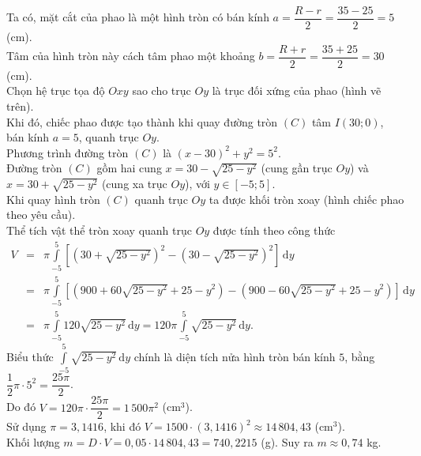 \begin{ex}
{\begin{center}
\end{center}
Ta có, mặt cắt của phao là một hình tròn có bán kính $a = \dfrac{R-r}{2} = \dfrac{35-25}{2} = 5$ (cm).\\
Tâm của hình tròn này cách tâm phao một khoảng $b = \dfrac{R+r}{2} = \dfrac{35+25}{2} = 30$ (cm).\\
Chọn hệ trục tọa độ $Oxy$ sao cho trục $Oy$ là trục đối xứng của phao (hình vẽ trên). \\
Khi đó, chiếc phao được tạo thành khi quay đường tròn $(C)$ tâm $I (30; 0)$, bán kính $a=5$, quanh trục $Oy$.\\
Phương trình đường tròn $(C)$ là $(x-30)^2 + y^2 = 5^2$.\\
Đường tròn $(C)$ gồm hai cung $x = 30 - \sqrt{25-y^2}$ (cung gần trục $Oy$) và $x = 30 + \sqrt{25-y^2}$ (cung xa trục $Oy$), với $y \in [-5; 5]$.\\
Khi quay hình tròn $(C)$ quanh trục $Oy$ ta được khối tròn xoay (hình chiếc phao theo yêu cầu).\\ 
Thể tích vật thể tròn xoay quanh trục $Oy$ được tính theo công thức
\begin{eqnarray*}
V & = & \pi \displaystyle \int \limits_{-5}^{5} \left[ \left( 30 + \sqrt{25-y^2} \right)^2 - \left( 30 - \sqrt{25-y^2} \right)^2 \right] \mathrm{\,d}y \\
&=& \pi \displaystyle \int \limits_{-5}^{5} \left[ (900 + 60\sqrt{25-y^2} + 25-y^2) - (900 - 60\sqrt{25-y^2} + 25-y^2) \right] \mathrm{\,d}y\\
&=& \pi \displaystyle \int \limits_{-5}^{5} 120\sqrt{25-y^2} \mathrm{\,d}y = 120\pi \displaystyle \int \limits_{-5}^{5} \sqrt{25-y^2} \mathrm{\,d}y.
\end{eqnarray*}
Biểu thức $\displaystyle \int \limits_{-5}^{5} \sqrt{25-y^2} \mathrm{\,d}y$ chính là diện tích nửa hình tròn bán kính $5$, bằng $\dfrac{1}{2} \pi \cdot 5^2 = \dfrac{25\pi}{2}$.\\
Do đó $V = 120\pi \cdot \dfrac{25\pi}{2} = 1\,500\pi^2$ (cm$^3$).\\
Sử dụng $\pi = 3{,}1416$, khi đó 
$V = 1500 \cdot (3{,}1416)^2 \approx 14\,804{,}43$ (cm$^3$).\\
Khối lượng $m = D \cdot V = 0{,}05 \cdot 14\,804{,}43 = 740{,}2215$ (g). Suy ra $m \approx 0{,}74$ kg.
}
\end{ex}

